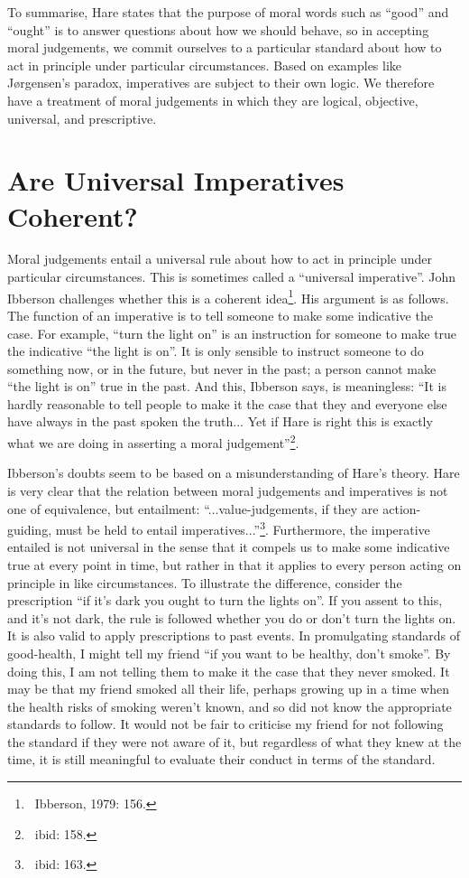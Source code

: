 \documentclass[12pt]{article}
\begin{document}
To summarise, Hare states that the purpose of moral words such as ``good'' and ``ought'' is to answer questions about how we should behave, so in accepting moral judgements, we commit ourselves to a particular standard about how to act in principle under particular circumstances. Based on examples like Jørgensen's paradox, imperatives are subject to their own logic. We therefore have a treatment of moral judgements in which they are logical, objective, universal, and prescriptive.

\section{Are Universal Imperatives Coherent?}

Moral judgements entail a universal rule about how to act in principle under particular circumstances. This is sometimes called a ``universal imperative''. John Ibberson challenges whether this is a coherent idea\footnote{~Ibberson, 1979: 156.}. His argument is as follows. The function of an imperative is to tell someone to make some indicative the case. For example, ``turn the light on'' is an instruction for someone to make true the indicative ``the light is on''. It is only sensible to instruct someone to do something now, or in the future, but never in the past; a person cannot make ``the light is on'' true in the past. And this, Ibberson says, is meaningless: ``It is hardly reasonable to tell people to make it the case that they and everyone else have always in the past spoken the truth... Yet if Hare is right this is exactly what we are doing in asserting a moral judgement''\footnote{~ibid: 158.}.

Ibberson's doubts seem to be based on a misunderstanding of Hare's theory. Hare is very clear that the relation between moral judgements and imperatives is not one of equivalence, but entailment: ``...value-judgements, if they are action-guiding, must be held to entail imperatives...''\footnote{~ibid: 163.}. Furthermore, the imperative entailed is not universal in the sense that it compels us to make some indicative true at every point in time, but rather in that it applies to every person acting on principle in like circumstances. To illustrate the difference, consider the prescription ``if it's dark you ought to turn the lights on''. If you assent to this, and it's not dark, the rule is followed whether you do or don't turn the lights on. It is also valid to apply prescriptions to past events. In promulgating standards of good-health, I might tell my friend ``if you want to be healthy, don't smoke''. By doing this, I am not telling them to make it the case that they never smoked. It may be that my friend smoked all their life, perhaps growing up in a time when the health risks of smoking weren't known, and so did not know the appropriate standards to follow. It would not be fair to criticise my friend for not following the standard if they were not aware of it, but regardless of what they knew at the time, it is still meaningful to evaluate their conduct in terms of the standard.
\end{document}
